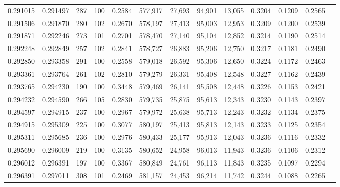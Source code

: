 \begin{tabular}{rrrrrrrrrrrrr}
0.291015 & 0.291497 &   287 & 100 &                                     0.2584 & 577,917 &  27,693 &  94,901 &  13,055 & 0.3204 & 0.1209 & 0.2565 \\
0.291506 & 0.291870 &   280 & 102 &                                     0.2670 & 578,197 &  27,413 &  95,003 &  12,953 & 0.3209 & 0.1200 & 0.2539 \\
0.291871 & 0.292246 &   273 & 101 &                                     0.2701 & 578,470 &  27,140 &  95,104 &  12,852 & 0.3214 & 0.1190 & 0.2514 \\
0.292248 & 0.292849 &   257 & 102 &                                     0.2841 & 578,727 &  26,883 &  95,206 &  12,750 & 0.3217 & 0.1181 & 0.2490 \\
0.292850 & 0.293358 &   291 & 100 &                                     0.2558 & 579,018 &  26,592 &  95,306 &  12,650 & 0.3224 & 0.1172 & 0.2463 \\
0.293361 & 0.293764 &   261 & 102 &                                     0.2810 & 579,279 &  26,331 &  95,408 &  12,548 & 0.3227 & 0.1162 & 0.2439 \\
0.293765 & 0.294230 &   190 & 100 &                                     0.3448 & 579,469 &  26,141 &  95,508 &  12,448 & 0.3226 & 0.1153 & 0.2421 \\
0.294232 & 0.294590 &   266 & 105 &                                     0.2830 & 579,735 &  25,875 &  95,613 &  12,343 & 0.3230 & 0.1143 & 0.2397 \\
0.294597 & 0.294915 &   237 & 100 &                                     0.2967 & 579,972 &  25,638 &  95,713 &  12,243 & 0.3232 & 0.1134 & 0.2375 \\
0.294915 & 0.295309 &   225 & 100 &                                     0.3077 & 580,197 &  25,413 &  95,813 &  12,143 & 0.3233 & 0.1125 & 0.2354 \\
0.295311 & 0.295685 &   236 & 100 &                                     0.2976 & 580,433 &  25,177 &  95,913 &  12,043 & 0.3236 & 0.1116 & 0.2332 \\
0.295690 & 0.296009 &   219 & 100 &                                     0.3135 & 580,652 &  24,958 &  96,013 &  11,943 & 0.3236 & 0.1106 & 0.2312 \\
0.296012 & 0.296391 &   197 & 100 &                                     0.3367 & 580,849 &  24,761 &  96,113 &  11,843 & 0.3235 & 0.1097 & 0.2294 \\
0.296391 & 0.297011 &   308 & 101 &                                     0.2469 & 581,157 &  24,453 &  96,214 &  11,742 & 0.3244 & 0.1088 & 0.2265 \\

\end{tabular}
